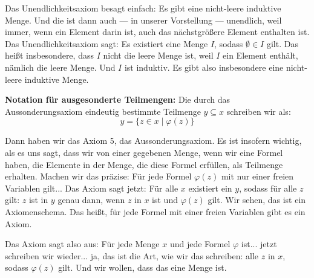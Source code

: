 \begin{spoken-clean}[00:22:54 - 00:25:03]
Das Unendlichkeitsaxiom besagt einfach: Es gibt eine nicht-leere induktive Menge. Und die ist dann auch --- in unserer Vorstellung --- unendlich, weil immer, wenn ein Element darin ist, auch das nächstgrößere Element enthalten ist. Das Unendlichkeitsaxiom sagt: Es existiert eine Menge $I$, sodass $\emptyset \in I$ gilt. Das heißt insbesondere, dass $I$ nicht die leere Menge ist, weil $I$ ein Element enthält, nämlich die leere Menge. Und $I$ ist induktiv. Es gibt also insbesondere eine nicht-leere induktive Menge.
\end{spoken-clean}

\begin{math-stroke}
\begin{axioms}
\end{axioms}

\textbf{Notation für ausgesonderte Teilmengen:}
Die durch das Aussonderungsaxiom eindeutig bestimmte Teilmenge $y \subseteq x$ schreiben wir als:
\[
y = \{ z \in x \mid \varphi(z) \}
\]
\end{math-stroke}

\begin{spoken-clean}[00:25:03 - 00:28:41]
Dann haben wir das Axiom 5, das Aussonderungsaxiom. Es ist insofern wichtig, als es uns sagt, dass wir von einer gegebenen Menge, wenn wir eine Formel haben, die Elemente in der Menge, die diese Formel erfüllen, als Teilmenge erhalten. Machen wir das präzise: Für jede Formel $\varphi(z)$ mit nur einer freien Variablen gilt... Das Axiom sagt jetzt: Für alle $x$ existiert ein $y$, sodass für alle $z$ gilt: $z$ ist in $y$ genau dann, wenn $z$ in $x$ ist und $\varphi(z)$ gilt. Wir sehen, das ist ein Axiomenschema. Das heißt, für jede Formel mit einer freien Variablen gibt es ein Axiom.

Das Axiom sagt also aus: Für jede Menge $x$ und jede Formel $\varphi$ ist... jetzt schreiben wir wieder... ja, das ist die Art, wie wir das schreiben: alle $z$ in $x$, sodass $\varphi(z)$ gilt. Und wir wollen, dass das eine Menge ist.
\end{spoken-clean}

